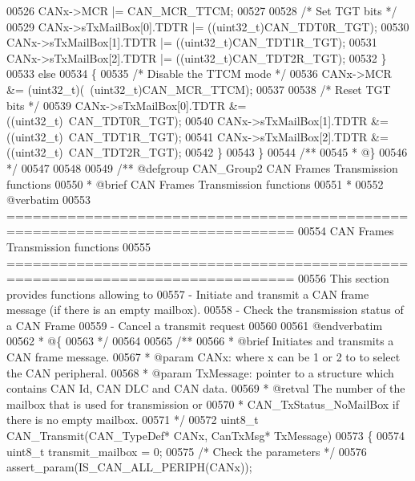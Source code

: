 \begin{DoxyCode}
00526     CANx->MCR |= CAN_MCR_TTCM;
00527 
00528     \textcolor{comment}{/* Set TGT bits */}
00529     CANx->sTxMailBox[0].TDTR |= ((uint32\_t)CAN_TDT0R_TGT);
00530     CANx->sTxMailBox[1].TDTR |= ((uint32\_t)CAN_TDT1R_TGT);
00531     CANx->sTxMailBox[2].TDTR |= ((uint32\_t)CAN_TDT2R_TGT);
00532   \}
00533   \textcolor{keywordflow}{else}
00534   \{
00535     \textcolor{comment}{/* Disable the TTCM mode */}
00536     CANx->MCR &= (uint32\_t)(~(uint32\_t)CAN_MCR_TTCM);
00537 
00538     \textcolor{comment}{/* Reset TGT bits */}
00539     CANx->sTxMailBox[0].TDTR &= ((uint32\_t)~CAN_TDT0R_TGT);
00540     CANx->sTxMailBox[1].TDTR &= ((uint32\_t)~CAN_TDT1R_TGT);
00541     CANx->sTxMailBox[2].TDTR &= ((uint32\_t)~CAN_TDT2R_TGT);
00542   \}
00543 \}
00544 \textcolor{comment}{/**}
00545 \textcolor{comment}{  * @\}}
00546 \textcolor{comment}{  */}
00547 
00548 
00549 \textcolor{comment}{/** @defgroup CAN\_Group2 CAN Frames Transmission functions}
00550 \textcolor{comment}{ *  @brief    CAN Frames Transmission functions }
00551 \textcolor{comment}{ *}
00552 \textcolor{comment}{@verbatim    }
00553 \textcolor{comment}{ ===============================================================================}
00554 \textcolor{comment}{                      CAN Frames Transmission functions}
00555 \textcolor{comment}{ ===============================================================================  }
00556 \textcolor{comment}{  This section provides functions allowing to }
00557 \textcolor{comment}{   - Initiate and transmit a CAN frame message (if there is an empty mailbox).}
00558 \textcolor{comment}{   - Check the transmission status of a CAN Frame}
00559 \textcolor{comment}{   - Cancel a transmit request}
00560 \textcolor{comment}{   }
00561 \textcolor{comment}{@endverbatim}
00562 \textcolor{comment}{  * @\{}
00563 \textcolor{comment}{  */}
00564 
00565 \textcolor{comment}{/**}
00566 \textcolor{comment}{  * @brief  Initiates and transmits a CAN frame message.}
00567 \textcolor{comment}{  * @param  CANx: where x can be 1 or 2 to to select the CAN peripheral.}
00568 \textcolor{comment}{  * @param  TxMessage: pointer to a structure which contains CAN Id, CAN DLC and CAN data.}
00569 \textcolor{comment}{  * @retval The number of the mailbox that is used for transmission or}
00570 \textcolor{comment}{  *         CAN\_TxStatus\_NoMailBox if there is no empty mailbox.}
00571 \textcolor{comment}{  */}
00572 uint8\_t CAN_Transmit(CAN\_TypeDef* CANx, CanTxMsg* TxMessage)
00573 \{
00574   uint8\_t transmit\_mailbox = 0;
00575   \textcolor{comment}{/* Check the parameters */}
00576   assert_param(IS\_CAN\_ALL\_PERIPH(CANx));

\end{DoxyCode}

